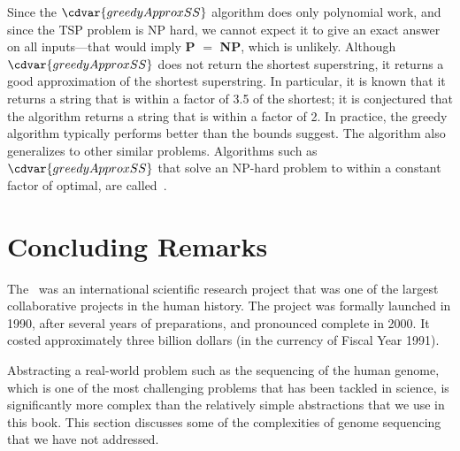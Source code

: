 \begin{cluster}
\label{grp:grm:genome::approximation-quality}

\begin{gram}
\label{grm:genome::approximation-quality}
Since the $\cdvar{greedyApproxSS}$ algorithm does only polynomial work,
and since the TSP problem is NP hard, we cannot expect it to give an
exact answer on all inputs---that would imply \textbf{P} $=$
\textbf{NP}, which is unlikely.
Although $\cdvar{greedyApproxSS}$ does not return the shortest
superstring, it returns a good approximation of the shortest
superstring.
In particular, it is known that it returns a string that is within a
factor of 3.5 of the shortest; it is conjectured that the algorithm
returns a string that is within a factor of 2.  
In practice, the greedy algorithm typically performs better than the
bounds suggest.  The algorithm also generalizes to other similar
problems.
Algorithms such as $\cdvar{greedyApproxSS}$ that solve an NP-hard problem
to within a constant factor of optimal, are
called~.

\end{gram}
\end{cluster}


\section{Concluding Remarks}
\label{sec:genome::concluding-remarks}

\begin{cluster}
\label{grp:grm:genome::human}

\begin{gram}
\label{grm:genome::human}
The~ was an international scientific
research project that was one of the largest collaborative projects in
the human history. 
The project was formally launched in 1990, after several years of
preparations, and pronounced complete in 2000.
It costed approximately three billion dollars (in the currency of
Fiscal Year 1991).

Abstracting a real-world problem such as the sequencing of the human
genome, which is one of the most challenging problems that has been
tackled in science, is significantly more complex than the relatively
simple abstractions that we  use in this book.  
This section discusses some of the complexities of genome sequencing
that we have not addressed.

\end{gram}
\end{cluster}


